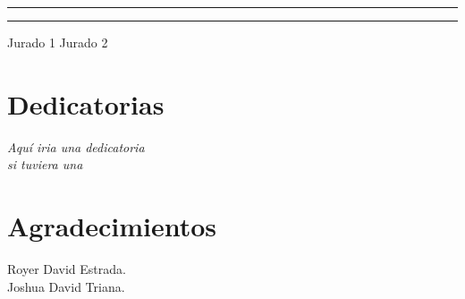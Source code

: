 \documentclass[12pt,letterpaper,openany]{book}
\begin{document}
\vspace*{1.3in}
\rule{60mm}{0.1mm} \hfill \rule{60mm}{0.1mm} \newline
Jurado 1 \hfill Jurado 2

\chapter*{Dedicatorias}
\begin{flushright}
\textit{Aquí iria una dedicatoria \\
si tuviera una}
\end{flushright}

\chapter*{Agradecimientos} %
Royer David Estrada.\\
Joshua David Triana. \\

\newpage
{}
\tableofcontents %
\end{document}
